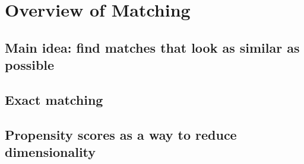 \documentclass[11pt,titlepage]{article}
\begin{document}
\section{Overview of Matching}
\subsection{Main idea: find matches that look as similar as possible}
\subsection{Exact matching}
\subsection{Propensity scores as a way to reduce dimensionality}

\begin{comment}
  [From earlier version.]  Similar to exact matching, propensity score
  matching is simply a means to obtain a balanced dataset, and the
  variance of the sample ATT is the same as in Equation~\ref{VarATT}.
  The only difference is the fact that the missing potential outcome
  $\hat{y}_{0i} | t_i=1$ is now estimated by the matched control unit
  \emph{via the propensity score}.  Since the propensity score does
  not estimate any population parameter and serves its role purely as
  a ``balancing score'', it does not introduce any added uncertainty
  to the variance of the treatment effect.\footnote{There is one
    slight exception to this, namely that ties in the propensity score
    are resolved by a random draw.  This is a scenario that is likely
    to happen when the explanatory covariates are largely categorical.
    Even in this instance, reporting estimates from one draw of
    matched pairs is correct (akin to drawing a random sample from a
    population), but to avoid potentially ``spurious'' findings, the
    user might well be advised to impute missing potential outcomes
    several times and combine estimates across these datasets via
    standard multiple imputation rules (see \citealt{rubin87}).}
  (Note, however, that knowledge of the propensity score might
  decrease the variance bound for the ATT, but not the ATE
  (\citealt{frolich02,hahn98,HirImbRid02}).)  In fact, this variance
  estimate might even be conservative for the sample ATT, providing
  over-coverage compared to the variance conditional on the covariates
  (\citealt{AbaImbND}).  If on the other hand we are interested in the
  population ATT, the variance may be estimated by the bootstrap, or
  even the Neyman estimate in Note~\ref{neyman} (\citealt{ImbensNDb},
  \citealt[Chapter 6]{ImbRubND}).
\end{comment}
\end{document}
